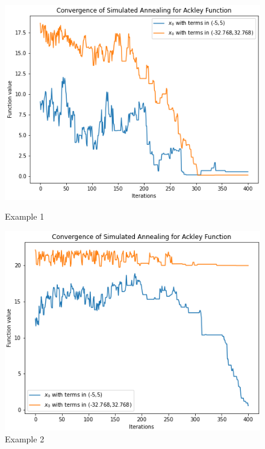 \begin{figure}[h]
  \centering
  \begin{minipage}[b]{0.3387\textwidth}
    \includegraphics[width=\textwidth]{Pictures/sa_convergence-ackley3-38-c.png}
    \caption{Example 1}\label{fig:SA_conv1}
  \end{minipage}
  \hspace{0.05cm} 
  \begin{minipage}[b]{0.33\textwidth}
    \includegraphics[width=\textwidth]{Pictures/sa_convergence-ackley3-37_c.png}
    \caption{Example 2}\label{fig:SA_conv2}
  \end{minipage}
\end{figure}\\
